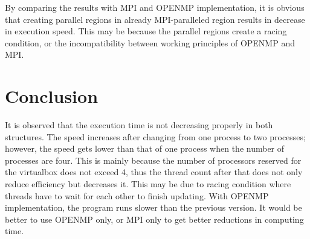 \documentclass{article}
\begin{document}
By comparing the results with MPI and OPENMP implementation, it is obvious that creating parallel regions in already MPI-paralleled region results in decrease in execution speed. This may be because the parallel regions create a racing condition, or the incompatibility between working principles of OPENMP and MPI.
\section{Conclusion}
It is observed that the execution time is not decreasing properly in both structures. The speed increases after changing from one process to two processes; however, the speed gets lower than that of one process when the number of processes are four. This is mainly because the number of processors reserved for the virtualbox does not exceed 4, thus the thread count after that does not only reduce efficiency but decreases it. This may be due to racing condition where threads have to wait for each other to finish updating. With OPENMP implementation, the program runs slower than the previous version. It would be better to use OPENMP only, or MPI only to get better reductions in computing time. 
\end{document}
